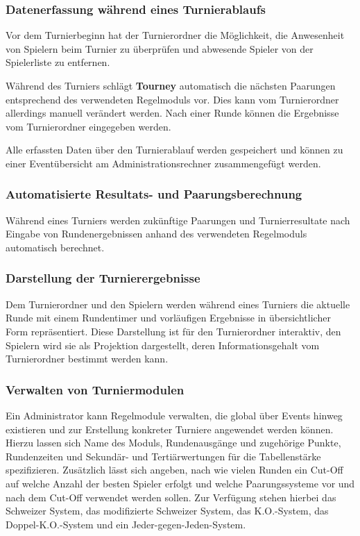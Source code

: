 \documentclass[11pt]{article}
\begin{document}
\subsubsection{Datenerfassung während eines Turnierablaufs}

Vor dem Turnierbeginn hat der Turnierordner die Möglichkeit, die Anwesenheit von Spielern beim Turnier zu überprüfen und abwesende Spieler von der Spielerliste zu entfernen.

Während des Turniers schlägt \textbf{Tourney} automatisch die nächsten Paarungen entsprechend des verwendeten Regelmoduls vor. Dies kann vom Turnierordner allerdings manuell verändert werden. Nach einer Runde können die Ergebnisse vom Turnierordner eingegeben werden.

Alle erfassten Daten über den Turnierablauf werden gespeichert und können zu einer Eventübersicht am Administrationsrechner zusammengefügt werden.

\subsubsection{Automatisierte Resultats- und Paarungsberechnung}

Während eines Turniers werden zukünftige Paarungen und Turnierresultate nach Eingabe von Rundenergebnissen anhand des verwendeten Regelmoduls automatisch berechnet.

\subsubsection{Darstellung der Turnierergebnisse}

Dem Turnierordner und den Spielern werden während eines Turniers die aktuelle Runde mit einem Rundentimer und vorläufigen Ergebnisse in übersichtlicher Form repräsentiert. Diese Darstellung ist für den Turnierordner interaktiv, den Spielern wird sie als Projektion dargestellt, deren Informationsgehalt vom Turnierordner bestimmt werden kann.

\newpage

\subsubsection{Verwalten von Turniermodulen}

Ein Administrator kann Regelmodule verwalten, die global über Events hinweg existieren und zur Erstellung konkreter Turniere angewendet werden können. Hierzu lassen sich Name des Moduls, Rundenausgänge und zugehörige Punkte, Rundenzeiten und Sekundär- und Tertiärwertungen für die Tabellenstärke spezifizieren. Zusätzlich lässt sich angeben, nach wie vielen Runden ein Cut-Off auf welche Anzahl der besten Spieler erfolgt und welche Paarungssysteme vor und nach dem Cut-Off verwendet werden sollen. Zur Verfügung stehen hierbei das Schweizer System, das modifizierte Schweizer System, das K.O.-System, das Doppel-K.O.-System und ein Jeder-gegen-Jeden-System.
\end{document}
